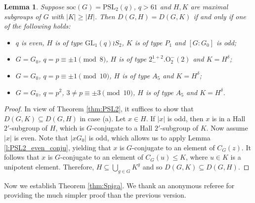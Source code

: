 \documentclass[twoside,a4paper,reqno,11pt]{amsart}
\newcommand{\<}{\langle}
\renewcommand{\>}{\rangle}
\newcommand{\leqs}{\leqslant}
\newcommand{\geqs}{\geqslant}
\newcommand{\soc}{\mathrm{soc}}
\newcommand{\PSL}{\mathrm{PSL}}
\newcommand{\GL}{\mathrm{GL}}
\newtheorem{lem}[thm]{Lemma}
\theoremstyle{definition}
\begin{document}
	\begin{lem}
		\label{l:psl_even_HK}
		Suppose $\soc(G) = \PSL_2(q)$, $q > 61$ and $H,K$ are maximal subgroups of $G$ with $|K|\geqs |H|$. Then $D(G,H) = D(G,K)$ if and only if one of the following holds:
		\begin{itemize}\addtolength{\itemsep}{0.2\baselineskip}
			\item[{\rm (a)}] $q$ is even, $H$ is of type $\GL_1(q)\wr S_2$, $K$ is of type $P_1$ and $[G:G_0]$ is odd;
			\item[{\rm (b)}] $G = G_0$, $q=p\equiv \pm1\pmod 8$, $H$ is of type $2_-^{1+2}.\mathrm{O}_2^-(2)$ and $K = H^\delta$;
			\item[{\rm (c)}] $G = G_0$, $q=p\equiv \pm1\pmod {10}$, $H$ is of type $A_5$ and $K = H^\delta$;
			\item[{\rm (d)}] $G = G_0$, $q = p^2$, $3\ne p\equiv\pm 3\pmod {10}$, $H$ is of type $A_5$ and $K = H^\delta$.
		\end{itemize}
	\end{lem}
	
	\begin{proof}
		In view of Theorem \ref{thm:PSL2}, it suffices to show that $D(G,K) \subseteq  D(G,H)$ in case (a). Let $x\in H$. If $|x|$ is odd, then $x$ is in a Hall $2'$-subgroup of $H$, which is $G$-conjugate to a Hall $2'$-subgroup of $K$. Now assume $|x|$ is even. Note that $|xG_0|$ is odd, which allows us to apply Lemma \ref{l:PSL2_even_conju}, yielding that $x$ is $G$-conjugate to an element of $C_G(z)$. It follows that $x$ is $G$-conjugate to an element of $C_G(u)\leqs K$, where $u\in K$ is a unipotent element. Therefore, $H\subseteq \bigcup_{g\in G}K^g$ and so $D(G,K)\subseteq D(G,H)$.
	\end{proof}

Now we establish Theorem \ref{thm:Spiga}. We thank an anonymous referee for providing the much simpler proof than the previous version.
\end{document}
